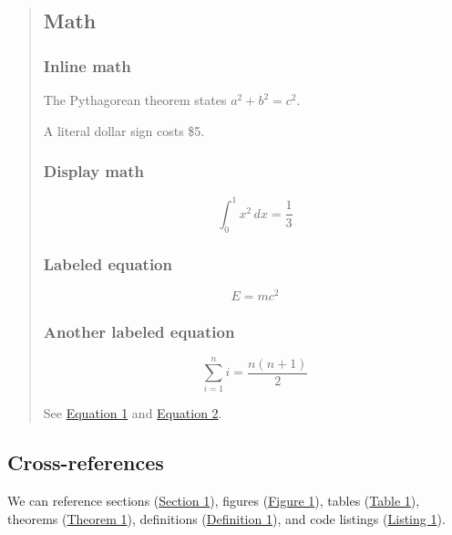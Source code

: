\documentclass[11pt]{article}
\begin{document}
\begin{quote}
\subsection{Math}
\label{sec-math}

\subsubsection{Inline math}
\label{inline-math}

The Pythagorean theorem states $a^2 + b^2 = c^2$.

A literal dollar sign costs \$5.

\subsubsection{Display math}
\label{display-math}

$$
\int_0^1 x^2 \, dx = \frac{1}{3}
$$

\subsubsection{Labeled equation}
\label{labeled-equation}

\begin{equation}
E = mc^2
\label{eq-einstein}
\end{equation}

\subsubsection{Another labeled equation}
\label{another-labeled-equation}

\begin{equation}
\sum_{i=1}^{n} i = \frac{n(n+1)}{2}
\label{eq-binomial}
\end{equation}

See \hyperref[eq-einstein]{Equation 1} and \hyperref[eq-binomial]{Equation 2}.


\end{quote}

\subsection{Cross-references}
\label{sec-crossref}

We can reference sections (\hyperref[sec-basics]{Section 1}), figures (\hyperref[fig-scatter]{Figure 1}), tables (\hyperref[tbl-planets]{Table 1}), theorems (\hyperref[thm-fermat]{Theorem 1}), definitions (\hyperref[def-group]{Definition 1}), and code listings (\hyperref[lst-example]{Listing 1}).
\end{document}
